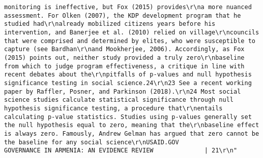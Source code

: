 \documentclass[
]{article}
\begin{document}
\begin{verbatim}
monitoring is ineffective, but Fox (2015) provides\r\na more nuanced assessment. For Olken (2007), the KDP development program that he studied had\r\nalready mobilized citizens years before his intervention, and Banerjee et al. (2010) relied on village\r\ncouncils that were comprised and determined by elites, who were susceptible to capture (see Bardhan\r\nand Mookherjee, 2006). Accordingly, as Fox (2015) points out, neither study provided a truly zero\r\nbaseline from which to judge program effectiveness, a critique in line with recent debates about the\r\npitfalls of p-values and null hypothesis significance testing in social science.24\r\n23 See a recent working paper by Raffler, Posner, and Parkinson (2018).\r\n24 Most social science studies calculate statistical significance through null hypothesis significance testing, a procedure that\r\nentails calculating p-value statistics. Studies using p-values generally set the null hypothesis equal to zero, meaning that the\r\nbaseline effect is always zero. Famously, Andrew Gelman has argued that zero cannot be the baseline for any social science\r\nUSAID.GOV                                                                 GOVERNANCE IN ARMENIA: AN EVIDENCE REVIEW              | 21\r\n"                                                                                                                                                                                                                                                                                                                                                                                                                                                                                     

\end{verbatim}
\end{document}
